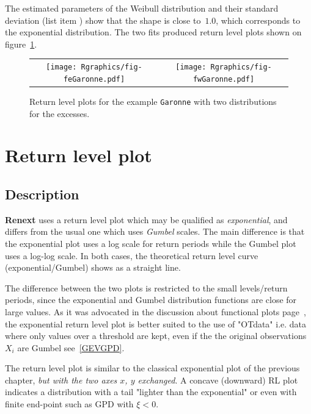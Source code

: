 \documentclass[a4paper]{report}
\begin{document}
\noindent
The estimated parameters of the Weibull distribution and their
 standard deviation (list item
\verb@sigma@) show that the shape is close to~$1.0$, which corresponds
to the exponential distribution. The two fits produced return level
plots shown on figure~\ref{RLP1}.


\begin{figure}
   \centering
   \begin{tabular}{c c} 
     \texttt{[image: Rgraphics/fig-feGaronne.pdf]} &
     \texttt{[image: Rgraphics/fig-fwGaronne.pdf]} 
   \end{tabular}
   \caption{\label{RLP1}Return level plots for the example 
     \texttt{Garonne} with two distributions
     for the excesses.}
\end{figure}


\section{Return level plot}
\subsection{Description} 
% 
\textbf{Renext} uses a
return level plot which may be qualified as \textit{exponential}, and
differs from the usual one which uses \textit{Gumbel} scales.  The
main difference is that the exponential plot uses a log scale for
return periods while the Gumbel plot uses a log-log scale.  In both
cases, the theoretical return level curve (exponential/Gumbel) shows
as a straight line.

The difference between the two plots is restricted to the small
levels/return periods, since the exponential and Gumbel distribution
functions are close for large values.  As it was advocated in the
discussion about functional plots page~\pageref{FUNCPLOTS}, the
exponential return level plot is better suited to the use of "OTdata"
i.e. data where only values over a threshold are kept, even if
the the original observations $X_i$ are Gumbel see~\ref{GEVGPD}.

The return level plot is similar to the classical exponential plot of
the previous chapter, %
\textit{but with the two axes $x$, $y$ exchanged}. A concave
(downward) RL plot indicates a distribution with a tail "lighter than
the exponential" or even with finite end-point such as GPD with
$\xi<0$.
\end{document}
